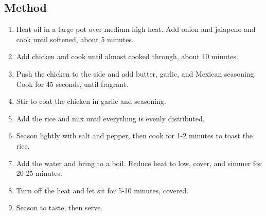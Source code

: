 \subsection{Method}

\begin{enumerate}
    \item Heat oil in a large pot over medium-high heat. Add onion and jalapeno and cook until softened, about 5 minutes.
    \item Add chicken and cook until almost cooked through, about 10 minutes.
    \item Push the chicken to the side and add butter, garlic, and Mexican seasoning. Cook for 45 seconds, until fragrant.
    \item Stir to coat the chicken in garlic and seasoning.
    \item Add the rice and mix until everything is evenly distributed.
    \item Season lightly with salt and pepper, then cook for 1-2 minutes to toast the rice.
    \item Add the water and bring to a boil. Reduce heat to low, cover, and simmer for 20-25 minutes.
    \item Turn off the heat and let sit for 5-10 minutes, covered.
    \item Season to taste, then serve.
\end{enumerate}
